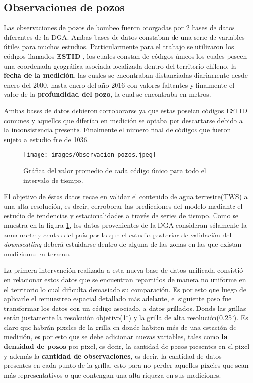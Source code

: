     \subsection{Observaciones de pozos}
    Las observaciones de pozos de bombeo fueron otorgadas por 2 bases de datos diferentes de la DGA. Ambas bases de datos constaban de una serie de variables útiles para muchos estudios.
    Particularmente para el trabajo se utilizaron los códigos llamados \textbf{ESTID} \cite{gwl}, los cuales constan de códigos únicos los cuales poseen una coordenada geográfica asociada localizada dentro
    del territorio chileno, la \textbf{fecha de la medición}, las cuales se encontraban distanciadas diariamente desde enero del 2000, hasta enero del año 2016 con valores faltantes y finalmente el valor de la \textbf{profundidad del pozo},
    la cual se encontraba en metros.

    Ambas bases de datos debieron corroborarse ya que éstas poseían códigos ESTID comunes y aquellos que diferían en medición se optaba por descartarse debido a la inconsistencia presente.
    Finalmente el número final de códigos que fueron sujeto a estudio fue de 1036. 

    \begin{figure}[H]
        \centering
              \texttt{[image: images/Observacion\_pozos.jpeg]}
        \caption[Datos de Pozos DGA sin procesar]{\footnotesize Gráfica del valor promedio de cada código único para todo el intervalo de tiempo.}
        \label{pozosDGA}
    \end{figure}

    El objetivo de éstos datos recae en validar el contenido de agua terrestre(TWS) a una alta resolución, es decir, corroborar las predicciones del modelo mediante el estudio de tendencias y estacionalidades a través de series de tiempo. 
    Como se muestra en la figura \ref{pozosDGA}, los datos provenientes de la DGA consideran sólamente la zona norte y centro del país por lo que el estudio posterior de validación del
    \textit{downscalling} deberá estuidarse dentro de alguna de las zonas en las que existan mediciones en terreno.

    La primera intervención realizada a esta nueva base de datos unificada consistió en relacionar estos datos que se encuentran repartidos de manera no uniforme en el territorio
    lo cual dificulta demasiado su comparación. Es por esto que luego de aplicarle el remuestreo espacial detallado más adelante, el siguiente paso fue transformar los datos con un código asociado,
    a datos grillados. Donde las grillas serán justamente la resolcuión objetivo(1$^{\circ}$) y la grilla de alta resolución(0.25$^{\circ}$). Es claro que habrán pixeles de la grilla en donde 
    habiten más de una estación de medición, es por esto que se debe adicionar nuevas variables, tales como \textbf{la densidad de pozos} por pixel, es decir, la cantidad de pozos presentes en el pixel y además
    la \textbf{cantidad de observaciones}, es decir, la cantidad de datos presentes en cada punto de la grilla, esto para no perder aquellos píxeles que sean más representativos o que 
    contengan una alta riqueza en sus mediciones.

